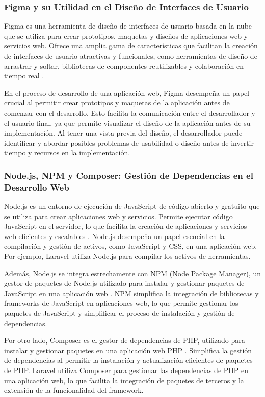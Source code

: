 \subsubsection{Figma y su Utilidad en el Diseño de Interfaces de Usuario}
Figma es una herramienta de diseño de interfaces de usuario basada en la nube que se utiliza para crear prototipos, maquetas y diseños de aplicaciones web y servicios web. Ofrece una amplia gama de características que facilitan la creación de interfaces de usuario atractivas y funcionales, como herramientas de diseño de arrastrar y soltar, bibliotecas de componentes reutilizables y colaboración en tiempo real \cite{figma}.

En el proceso de desarrollo de una aplicación web, Figma desempeña un papel crucial al permitir crear prototipos y maquetas de la aplicación antes de comenzar con el desarrollo. Esto facilita la comunicación entre el desarrollador y el usuario final, ya que permite visualizar el diseño de la aplicación antes de su implementación. Al tener una vista previa del diseño, el desarrollador puede identificar y abordar posibles problemas de usabilidad o diseño antes de invertir tiempo y recursos en la implementación.


\subsubsection{Node.js, NPM y Composer: Gestión de Dependencias en el Desarrollo Web}
Node.js es un entorno de ejecución de JavaScript de código abierto y gratuito que se utiliza para crear aplicaciones web y servicios. Permite ejecutar código JavaScript en el servidor, lo que facilita la creación de aplicaciones y servicios web eficientes y escalables \cite{nodejs}. Node.js desempeña un papel esencial en la compilación y gestión de activos, como JavaScript y CSS, en una aplicación web. Por ejemplo, Laravel utiliza Node.js para compilar los activos de herramientas.

Además, Node.js se integra estrechamente con NPM (Node Package Manager), un gestor de paquetes de Node.js utilizado para instalar y gestionar paquetes de JavaScript en una aplicación web \cite{npm}. NPM simplifica la integración de bibliotecas y frameworks de JavaScript en aplicaciones web, lo que permite gestionar los paquetes de JavaScript y simplificar el proceso de instalación y gestión de dependencias.

Por otro lado, Composer es el gestor de dependencias de PHP, utilizado para instalar y gestionar paquetes en una aplicación web PHP \cite{composer}. Simplifica la gestión de dependencias al permitir la instalación y actualización eficientes de paquetes de PHP. Laravel utiliza Composer para gestionar las dependencias de PHP en una aplicación web, lo que facilita la integración de paquetes de terceros y la extensión de la funcionalidad del framework.



